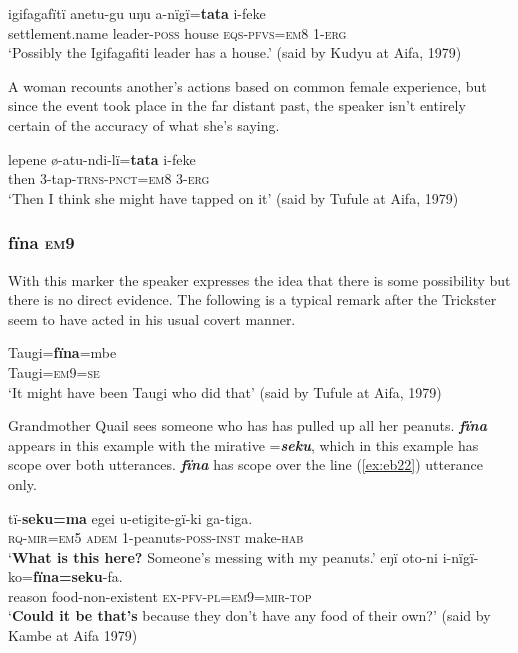\documentclass[output=paper]{langsci/langscibook}
\begin{document}
\begin{exe}
	\ex \label{ex:eb18}
	\gll igifagafïtï anetu-gu uŋu a-nïgï=\textbf{tata} i-feke\\
	{settlement.name} leader-\textsc{poss} house \textsc{eqs-pfvs=em8} 1-\textsc{erg}\\
	\trans ‘Possibly the Igifagafiti leader has a house.’ (said by Kudyu at Aifa, 1979)
\end{exe}

A woman recounts another's actions based on common female experience, but since the event took place in the far distant past, the speaker isn’t entirely certain of the accuracy of what she’s saying.

\begin{exe}
	\ex \label{ex:eb19}
	\gll lepene ø-atu-ndi-lï=\textbf{tata} i-feke\\
	then 3-tap-\textsc{trns-pnct=em8} 3-\textsc{erg}\\
	\trans ‘Then I think she might have tapped on it’ (said by Tufule at Aifa, 1979)
\end{exe}

\subsubsection{fïna \textsc{em}9} 
With this marker the speaker expresses the idea that there is some possibility but there is no direct evidence. 
The following is a typical remark after the Trickster seem to have acted in his usual covert manner.

\begin{exe}
	\ex \label{ex:eb20}
	\gll Taugi=\textbf{fïna}=mbe\\
	Taugi=\textsc{em9=se}\\
	\trans ‘It might have been Taugi who did that’ (said by Tufule at Aifa, 1979)
\end{exe}

Grandmother Quail sees someone who has has pulled up all her peanuts. \textbf{\textit{fïna}} appears in this example with the mirative =\textbf{\textit{seku}}, which in this example has scope over both utterances. \textbf{\textit{fïna}} has scope over the line (\ref{ex:eb22}) utterance only.

\begin{exe}
	\ex 
	\begin{xlist}
	\ex	\label{ex:eb21}
	\gll tï-\textbf{seku=ma} egei u-etigite-gï-ki ga-tiga.\\
	\textsc{rq-mir=em5} \textsc{adem} 1-peanuts-\textsc{poss-inst} make-\textsc{hab}\\
	\trans ‘\textbf{What is this here?}  Someone’s messing with my peanuts.'
	\ex \label{ex:eb22}
	\gll eŋï oto-ni i-nïgï-ko=\textbf{fïna=seku}-fa.\\ 
	reason food-non-existent \textsc{ex-pfv-pl=em9=mir-top}\\
	\trans `\textbf{Could it be that’s} because they don’t have any food of their own?’ (said by Kambe at Aifa 1979)
	\end{xlist}
\end{exe}
\end{document}
